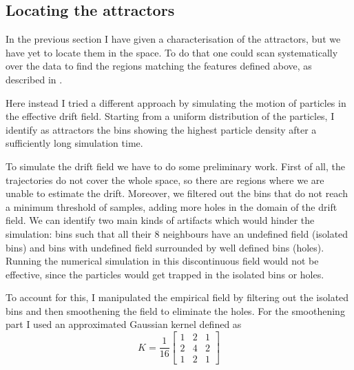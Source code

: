 \documentclass[a4paper]{article}
\begin{document}
\subsection{Locating the attractors}

In the previous section I have given a characterisation of the attractors, but we have yet to locate them in the space. To do that one could scan systematically over the data to find the regions matching the features defined above, as described in \cite{hoze2012}.

Here instead I tried a different approach by simulating the motion of particles in the effective drift field. Starting from a uniform distribution of the particles, I identify as attractors the bins showing the highest particle density after a sufficiently long simulation time.

To simulate the drift field we have to do some preliminary work. First of all, the trajectories do not cover the whole space, so there are regions where we are unable to estimate the drift. Moreover, we filtered out the bins that do not reach a minimum threshold of samples, adding more holes in the domain of the drift field.
We can identify two main kinds of artifacts which would hinder the simulation: bins such that all their 8 neighbours have an undefined field (isolated bins) and bins with undefined field surrounded by well defined bins (holes). Running the numerical simulation in this discontinuous field would not be effective, since the particles would get trapped in the isolated bins or holes.

To account for this, I manipulated the empirical field by filtering out the isolated bins and then smoothening the field to eliminate the holes. For the smoothening part I used an approximated Gaussian kernel defined as
\begin{equation}
K = \frac{1}{16} \begin{bmatrix} 1 & 2 & 1 \\ 2 & 4 & 2 \\ 1 & 2 & 1\end{bmatrix}
\end{equation}
\end{document}

